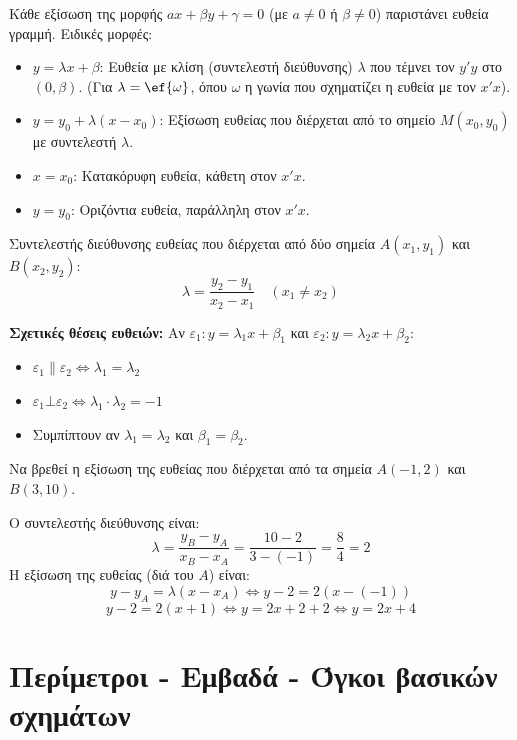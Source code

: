 Κάθε εξίσωση της μορφής $a x + \beta y + \gamma = 0$ (με $a \neq 0$ ή $\beta \neq 0$) παριστάνει ευθεία γραμμή.
Ειδικές μορφές:
\begin{itemize}
    \item $y = \lambda x + \beta$: Ευθεία με κλίση (συντελεστή διεύθυνσης) $\lambda$ που τέμνει τον $y'y$ στο $(0, \beta)$. (Για $\lambda = \ef{\omega}$, όπου $\omega$ η γωνία που σχηματίζει η ευθεία με τον $x'x$).
    \item $y = y_0 + \lambda(x - x_0)$: Εξίσωση ευθείας που διέρχεται από το σημείο $M(x_0, y_0)$ με συντελεστή $\lambda$.
    \item $x = x_0$: Κατακόρυφη ευθεία, κάθετη στον $x'x$.
    \item $y = y_0$: Οριζόντια ευθεία, παράλληλη στον $x'x$.
\end{itemize}
Συντελεστής διεύθυνσης ευθείας που διέρχεται από δύο σημεία $A(x_1, y_1)$ και $B(x_2, y_2)$: 
\[ \lambda = \dfrac{y_2 - y_1}{x_2 - x_1} \quad (x_1 \neq x_2) \]

\textbf{Σχετικές θέσεις ευθειών:} Αν $\varepsilon_1: y = \lambda_1 x + \beta_1$ και $\varepsilon_2: y = \lambda_2 x + \beta_2$:
\begin{itemize}
    \item $\varepsilon_1 \parallel \varepsilon_2 \Leftrightarrow \lambda_1 = \lambda_2$
    \item $\varepsilon_1 \bot \varepsilon_2 \Leftrightarrow \lambda_1 \cdot \lambda_2 = -1$
    \item Συμπίπτουν αν $\lambda_1 = \lambda_2$ και $\beta_1 = \beta_2$.
\end{itemize}


Να βρεθεί η εξίσωση της ευθείας που διέρχεται από τα σημεία $A(-1, 2)$ και $B(3, 10)$.

\lysh
Ο συντελεστής διεύθυνσης είναι:
\[ \lambda = \dfrac{y_B - y_A}{x_B - x_A} = \dfrac{10 - 2}{3 - (-1)} = \dfrac{8}{4} = 2 \]
Η εξίσωση της ευθείας (διά του $A$) είναι:
\[ y - y_A = \lambda(x - x_A) \Leftrightarrow y - 2 = 2(x - (-1)) \]
\[ y - 2 = 2(x + 1) \Leftrightarrow y = 2x + 2 + 2 \Leftrightarrow y = 2x + 4 \]

\section{Περίμετροι - Εμβαδά - Όγκοι βασικών σχημάτων}

